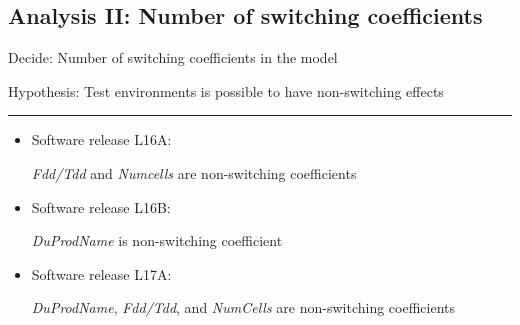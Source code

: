 \documentclass{beamer}
\begin{document}
\subsection{Analysis II: Number of switching coefficients}
\begin{frame}[fragile]
\small{Decide: Number of switching coefficients in the model

Hypothesis: Test environments is possible to have non-switching effects}
\rule{\textwidth}{0.4pt}

\begin{itemize}
	\item Software release L16A: 
	
	\textit{Fdd/Tdd} and \textit{Numcells} are non-switching coefficients

	\item Software release L16B: 
	
	\textit{DuProdName} is non-switching coefficient


	\item Software release L17A: 
	
	\textit{DuProdName}, \textit{Fdd/Tdd}, and \textit{NumCells} are non-switching coefficients
\end{itemize}

\end{frame}
\end{document}
